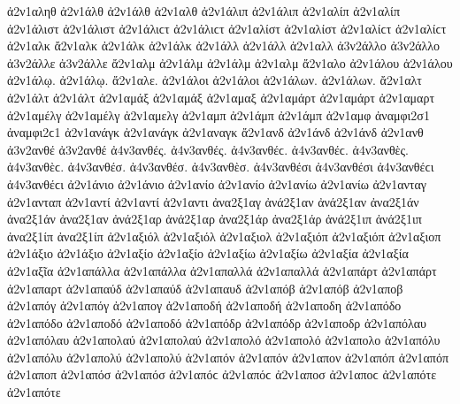 {ἀ2ν1αληθ 
ἀ2ν1άλθ ἀ2ν1άλθ   %
ἀ2ν1αλθ 
ἀ2ν1άλιπ ἀ2ν1άλιπ   %
ἀ2ν1αλίπ ἀ2ν1αλίπ 
ἀ2ν1άλιστ ἀ2ν1άλιστ ἀ2ν1άλιϲτ ἀ2ν1άλιϲτ   %
ἀ2ν1αλίστ ἀ2ν1αλίστ ἀ2ν1αλίϲτ ἀ2ν1αλίϲτ 
ἀ2ν1αλκ   %
ἄ2ν1αλκ   %
ἀ2ν1άλκ ἀ2ν1άλκ 
ἀ2ν1άλλ ἀ2ν1άλλ   %
ἀ2ν1αλλ 
ἀ3ν2άλλο ἀ3ν2άλλο   %
ἀ3ν2άλλε ἀ3ν2άλλε 
ἄ2ν1αλμ   %
ἀ2ν1άλμ ἀ2ν1άλμ   %
ἀ2ν1αλμ 
ἄ2ν1αλο   %
ἀ2ν1άλου ἀ2ν1άλου 
ἀ2ν1άλῳ. ἀ2ν1άλῳ. 
ἄ2ν1αλε. 
ἀ2ν1άλοι ἀ2ν1άλοι 
ἀ2ν1άλων. ἀ2ν1άλων. 
ἄ2ν1αλτ   %
ἀ2ν1άλτ ἀ2ν1άλτ 
ἀ2ν1αμάξ ἀ2ν1αμάξ   %
ἀ2ν1αμαξ 
ἀ2ν1αμάρτ ἀ2ν1αμάρτ   %
ἀ2ν1αμαρτ 
ἀ2ν1αμέλγ ἀ2ν1αμέλγ   %
ἀ2ν1αμελγ 
ἀ2ν1αμπ   %
ἀ2ν1άμπ ἀ2ν1άμπ   %
ἀ2ν1αμφ   %
ἀναμφι2σ1 ἀναμφι2ϲ1   %
ἀ2ν1ανάγκ ἀ2ν1ανάγκ   %
ἀ2ν1αναγκ 
ἄ2ν1ανδ   %
ἀ2ν1άνδ ἀ2ν1άνδ 
ἀ2ν1ανθ   %
ἀ3ν2ανθέ ἀ3ν2ανθέ   %
ἀ4ν3ανθές. ἀ4ν3ανθές. ἀ4ν3ανθέϲ. ἀ4ν3ανθέϲ.   %
ἀ4ν3ανθὲς. ἀ4ν3ανθὲϲ. 
ἀ4ν3ανθέσ. ἀ4ν3ανθέσ. 
ἀ4ν3ανθὲσ. 
ἀ4ν3ανθέσι ἀ4ν3ανθέσι ἀ4ν3ανθέϲι ἀ4ν3ανθέϲι 
ἀ2ν1άνιο ἀ2ν1άνιο   %
ἀ2ν1ανίο ἀ2ν1ανίο 
ἀ2ν1ανίω ἀ2ν1ανίω 
ἀ2ν1ανταγ   %
ἀ2ν1ανταπ   %
ἀ2ν1αντί ἀ2ν1αντί   %
ἀ2ν1αντι 
ἀνα2ξ1αγ   %
ἀνά2ξ1αν ἀνά2ξ1αν   %
ἀνα2ξ1άν ἀνα2ξ1άν 
ἀνα2ξ1αν   %
ἀνά2ξ1αρ ἀνά2ξ1αρ   %
ἀνα2ξ1άρ ἀνα2ξ1άρ 
ἀνά2ξ1ιπ ἀνά2ξ1ιπ   %
ἀνα2ξ1ίπ ἀνα2ξ1ίπ 
ἀ2ν1αξιόλ ἀ2ν1αξιόλ   %
ἀ2ν1αξιολ 
ἀ2ν1αξιόπ ἀ2ν1αξιόπ   %
ἀ2ν1αξιοπ 
ἀ2ν1άξιο ἀ2ν1άξιο   %
ἀ2ν1αξίο ἀ2ν1αξίο 
ἀ2ν1αξίω ἀ2ν1αξίω 
ἀ2ν1αξία ἀ2ν1αξία 
ἀ2ν1αξῖα 
ἀ2ν1απάλλα ἀ2ν1απάλλα   %
ἀ2ν1απαλλά ἀ2ν1απαλλά 
ἀ2ν1απάρτ ἀ2ν1απάρτ   %
ἀ2ν1απαρτ 
ἀ2ν1απαύδ ἀ2ν1απαύδ   %
ἀ2ν1απαυδ 
ἀ2ν1απόβ ἀ2ν1απόβ   %
ἀ2ν1αποβ 
ἀ2ν1απόγ ἀ2ν1απόγ   %
ἀ2ν1απογ 
ἀ2ν1αποδή ἀ2ν1αποδή   %
ἀ2ν1αποδη 
ἀ2ν1απόδο ἀ2ν1απόδο   %
ἀ2ν1αποδό ἀ2ν1αποδό 
ἀ2ν1απόδρ ἀ2ν1απόδρ   %
ἀ2ν1αποδρ 
ἀ2ν1απόλαυ ἀ2ν1απόλαυ   %
ἀ2ν1απολαύ ἀ2ν1απολαύ 
ἀ2ν1απολό ἀ2ν1απολό   %
ἀ2ν1απολο 
ἀ2ν1απόλυ ἀ2ν1απόλυ   %
ἀ2ν1απολύ ἀ2ν1απολύ 
ἀ2ν1απόν ἀ2ν1απόν   %
ἀ2ν1απον 
ἀ2ν1απόπ ἀ2ν1απόπ   %
ἀ2ν1αποπ 
ἀ2ν1απόσ ἀ2ν1απόσ ἀ2ν1απόϲ ἀ2ν1απόϲ   %
ἀ2ν1αποσ ἀ2ν1αποϲ 
ἀ2ν1απότε ἀ2ν1απότε   %
}
